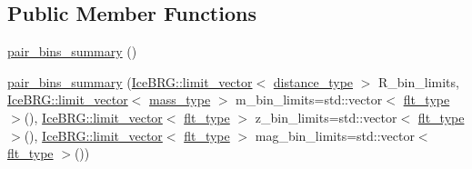 \subsection*{Public Member Functions}
\begin{DoxyCompactItemize}
\item 
\hyperlink{classIceBRG_1_1pair__bins__summary_adf88b28f6ffab4d0e0aadd8688efd630}{pair\+\_\+bins\+\_\+summary} ()
\item 
\hyperlink{classIceBRG_1_1pair__bins__summary_a27d287757aa70f2017be0daa9e74d6da}{pair\+\_\+bins\+\_\+summary} (\hyperlink{classIceBRG_1_1limit__vector}{Ice\+B\+R\+G\+::limit\+\_\+vector}$<$ \hyperlink{namespaceIceBRG_a45499647eb87e24c10ab32c628711cec}{distance\+\_\+type} $>$ R\+\_\+bin\+\_\+limits, \hyperlink{classIceBRG_1_1limit__vector}{Ice\+B\+R\+G\+::limit\+\_\+vector}$<$ \hyperlink{namespaceIceBRG_a1be72ac4918a9b029f2eefa084213e35}{mass\+\_\+type} $>$ m\+\_\+bin\+\_\+limits=std\+::vector$<$ \hyperlink{lib_2IceBRG__main_2common_8h_ad0f130a56eeb944d9ef2692ee881ecc4}{flt\+\_\+type} $>$(), \hyperlink{classIceBRG_1_1limit__vector}{Ice\+B\+R\+G\+::limit\+\_\+vector}$<$ \hyperlink{lib_2IceBRG__main_2common_8h_ad0f130a56eeb944d9ef2692ee881ecc4}{flt\+\_\+type} $>$ z\+\_\+bin\+\_\+limits=std\+::vector$<$ \hyperlink{lib_2IceBRG__main_2common_8h_ad0f130a56eeb944d9ef2692ee881ecc4}{flt\+\_\+type} $>$(), \hyperlink{classIceBRG_1_1limit__vector}{Ice\+B\+R\+G\+::limit\+\_\+vector}$<$ \hyperlink{lib_2IceBRG__main_2common_8h_ad0f130a56eeb944d9ef2692ee881ecc4}{flt\+\_\+type} $>$ mag\+\_\+bin\+\_\+limits=std\+::vector$<$ \hyperlink{lib_2IceBRG__main_2common_8h_ad0f130a56eeb944d9ef2692ee881ecc4}{flt\+\_\+type} $>$())
\item 

\end{DoxyCompactItemize}
